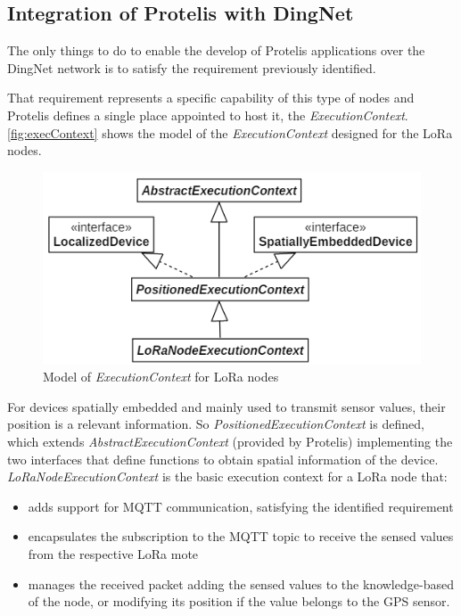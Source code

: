 \subsection{Integration of Protelis with DingNet}
\label{sec:PoverD}
The only things to do to enable the develop of Protelis applications over the DingNet network is to satisfy the requirement previously identified.

That requirement represents a specific capability of this type of nodes and Protelis defines a single place appointed to host it, the \mbox{\textit{ExecutionContext}}.
\autoref{fig:execContext} shows the model of the \mbox{\textit{ExecutionContext}} designed for the LoRa nodes. 
\begin{figure}[H]
    \centering
    \includegraphics{figures/execContext.png}
    \caption{Model of \textit{ExecutionContext} for LoRa nodes}
    \label{fig:execContext}
\end{figure}
\noindent For devices spatially embedded and mainly used to transmit sensor values, their position is a relevant information. So \mbox{\textit{PositionedExecutionContext}} is defined, which extends \mbox{\textit{AbstractExecutionContext}} (provided by Protelis) implementing the two interfaces that define functions to obtain spatial information of the device.
\mbox{\textit{LoRaNodeExecutionContext}} is the basic execution context for a LoRa node that:
% 
\begin{itemize}
    \item adds support for MQTT communication, satisfying the identified requirement
    \item encapsulates the subscription to the MQTT topic to receive the sensed values from the respective LoRa mote
    \item manages the received packet adding the sensed values to the knowledge-based of the node, or modifying its position if the value belongs to the GPS sensor.
\end{itemize}
